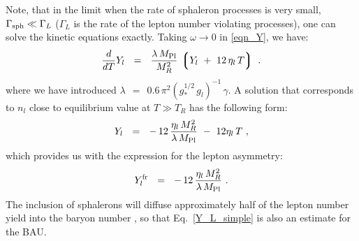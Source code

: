\documentclass[12pt]{revtex4}
\newcommand{\lgr}{\left\lgroup}
\newcommand{\rgr}{\right\rgroup}
\newcommand{\Mpl}{M_{\rm Pl}}
\newcommand{\Gsph}{\Gamma_{\rm sph}}
\begin{document}
	Note, that in the limit when the rate of sphaleron processes
	is very small, $ \Gsph \ll \Gamma_L $ ($ \Gamma_L $ is the rate
	of the lepton number violating processes), one can solve the kinetic equations
	exactly. 
	Taking $ \omega \to 0 $ in \eqref{eqn_Y}, we have:
\begin{equation}
\label{btz_simple}
	\frac{d}{dT}Y_l ~~=~~ \frac{\lambda\,\Mpl}{M_R^2} \,
			\lgr Y_l ~+~ 12\,\eta_l\, T \rgr~.
\end{equation}
	where we have introduced $
	\lambda ~~=~~ 0.6\, \pi^2
    		         (g_*^{1/2}\, g_l)^{-1}\,\gamma$. 
A solution that corresponds to $n_l$ close to equilibrium value at $T\gg T_R$ has the following form:
\begin{equation}
\label{btz_sol_simple}
	Y_l ~~=~~ -\,12\,\frac{\eta_l\,M_R^2}{\lambda\,\Mpl}
		~-~ 12\eta_l\,T ~,
\end{equation}
	which provides us with the expression for the lepton asymmetry:
\begin{equation}
\label{Y_L_simple}
	Y_l^{\rm fr} ~~=~~ -\, 12\,\frac{\eta_l\,M_R^2}{\lambda\,\Mpl}~.
\end{equation}
	The inclusion of sphalerons will diffuse approximately
	half of the lepton number yield into the baryon number
\cite{Kuzmin:1985mm}, so that Eq.~\eqref{Y_L_simple} is also an estimate for the BAU.
	
\end{document}
